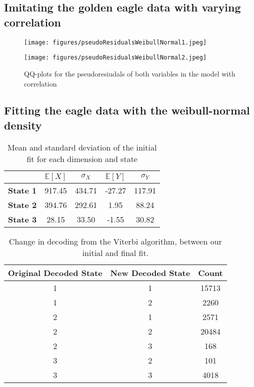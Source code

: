 \subsection{Imitating the golden eagle data with varying correlation}
\begin{figure}[h]
  \centering
  \begin{minipage}[b]{0.49\textwidth}
    \texttt{[image: figures/pseudoResidualsWeibullNormal1.jpeg]}
  \end{minipage}
  \hfill
  \begin{minipage}[b]{0.49\textwidth}
    \texttt{[image: figures/pseudoResidualsWeibullNormal2.jpeg]}
  \end{minipage}
  \caption{QQ-plots for the pseudoresiudals of both variables in the model with correlation}
  \label{combinedQQPlotsCorrelation}
\end{figure}
\subsection{Fitting the eagle data with the weibull-normal density}
\begin{table}[ht]
  \centering
  \begin{tabular}{lcccc}
    \hline
    & $\mathbb{E}\left[X\right]$ & $\sigma_X$ & $\mathbb{E}\left[Y\right]$ & $\sigma_Y$ \\ 
    \hline
    \textbf{State 1} & 917.45 & 434.71 & -27.27 & 117.91 \\ 
    \textbf{State 2} & 394.76 & 292.61 & 1.95 & 88.24 \\ 
    \textbf{State 3} & 28.15 & 33.50 & -1.55 & 30.82 \\ 
     \hline
  \end{tabular}
  \caption{Mean and standard deviation of the initial fit for each dimension and state}
  \label{finalFitMeans}
\end{table}
\begin{table}[h]
  \centering
  \begin{tabular}{ccc}
      \hline
      \textbf{Original Decoded State} & \textbf{New Decoded State} & \textbf{Count} \\
      \hline
      1 & 1 & 15713 \\
      1 & 2 & 2260 \\
      2 & 1 & 2571 \\
      2 & 2 & 20484 \\
      2 & 3 & 168 \\
      3 & 2 & 101 \\
      3 & 3 & 4018 \\
      \hline
  \end{tabular}
  \caption{Change in decoding from the Viterbi algorithm, between our initial and final fit.}
  \label{changeEstimFit}
\end{table}
\newpage
